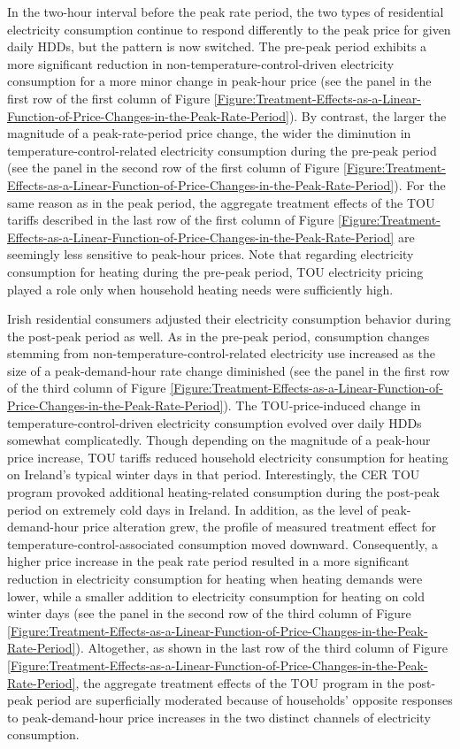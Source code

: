 In the two-hour interval before the peak rate period, the two types of residential electricity consumption continue to respond differently to the peak price for given daily HDDs, but the pattern is now switched. The pre-peak period exhibits a more significant reduction in non-temperature-control-driven electricity consumption for a more minor change in peak-hour price (see the panel in the first row of the first column of Figure \ref{Figure:Treatment-Effects-as-a-Linear-Function-of-Price-Changes-in-the-Peak-Rate-Period}). By contrast, the larger the magnitude of a peak-rate-period price change, the wider the diminution in temperature-control-related electricity consumption during the pre-peak period (see the panel in the second row of the first column of Figure \ref{Figure:Treatment-Effects-as-a-Linear-Function-of-Price-Changes-in-the-Peak-Rate-Period}). For the same reason as in the peak period, the aggregate treatment effects of the TOU tariffs described in the last row of the first column of Figure \ref{Figure:Treatment-Effects-as-a-Linear-Function-of-Price-Changes-in-the-Peak-Rate-Period} are seemingly less sensitive to peak-hour prices. Note that regarding electricity consumption for heating during the pre-peak period, TOU electricity pricing played a role only when household heating needs were sufficiently high.

Irish residential consumers adjusted their electricity consumption behavior during the post-peak period as well. As in the pre-peak period, consumption changes stemming from non-temperature-control-related electricity use increased as the size of a peak-demand-hour rate change diminished (see the panel in the first row of the third column of Figure \ref{Figure:Treatment-Effects-as-a-Linear-Function-of-Price-Changes-in-the-Peak-Rate-Period}). The TOU-price-induced change in temperature-control-driven electricity consumption evolved over daily HDDs somewhat complicatedly. Though depending on the magnitude of a peak-hour price increase, TOU tariffs reduced household electricity consumption for heating on Ireland's typical winter days in that period. Interestingly, the CER TOU program provoked additional heating-related consumption during the post-peak period on extremely cold days in Ireland. In addition, as the level of peak-demand-hour price alteration grew, the profile of measured treatment effect for temperature-control-associated consumption moved downward. Consequently, a higher price increase in the peak rate period resulted in a more significant reduction in electricity consumption for heating when heating demands were lower, while a smaller addition to electricity consumption for heating on cold winter days (see the panel in the second row of the third column of Figure \ref{Figure:Treatment-Effects-as-a-Linear-Function-of-Price-Changes-in-the-Peak-Rate-Period}). Altogether, as shown in the last row of the third column of Figure \ref{Figure:Treatment-Effects-as-a-Linear-Function-of-Price-Changes-in-the-Peak-Rate-Period}, the aggregate treatment effects of the TOU program in the post-peak period are superficially moderated because of households' opposite responses to peak-demand-hour price increases in the two distinct channels of electricity consumption.  

